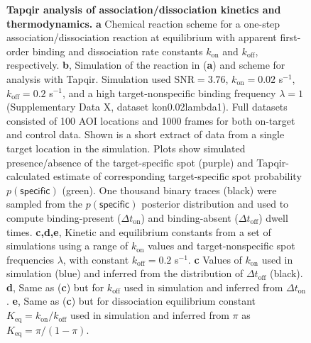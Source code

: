 \begin{figure}[h]
\caption{\textbf{Tapqir analysis of association/dissociation kinetics and thermodynamics.} \textbf{a} Chemical reaction scheme for a one-step association/dissociation reaction at equilibrium with apparent first-order binding and dissociation rate constants $k_{\mathrm{on}}$ and $k_{\mathrm{off}}$, respectively. \textbf{b}, Simulation of the reaction in (\textbf{a}) and scheme for analysis with Tapqir. Simulation used $\mathrm{SNR} = 3.76$, $k_\mathrm{on} = 0.02$ s$^{-1}$, $k_\mathrm{off} = 0.2$ s$^{-1}$, and a high target-nonspecific binding frequency $\lambda = 1$ (Supplementary Data X, dataset kon0.02lambda1). Full datasets consisted of 100 AOI locations and 1000 frames for both on-target and control data. Shown is a short extract of data from a single target location in the simulation.  Plots show simulated presence/absence of the target-specific spot  (purple) and Tapqir-calculated estimate of corresponding target-specific spot probability $p(\mathsf{specific})$ (green). One thousand binary traces (black) were sampled from the $p(\mathsf{specific})$ posterior distribution and used to compute binding-present ($\Delta t_\mathrm{on}$) and binding-absent ($\Delta t_\mathrm{off}$) dwell times. \textbf{c,d,e}, Kinetic and equilibrium constants from a set of simulations using a range of $k_\mathrm{on}$ values and  target-nonspecific spot frequencies $\lambda$, with constant $k_\mathrm{off} = 0.2$ s$^{-1}$. \textbf{c} Values of $k_{\mathrm{on}}$ used in simulation (blue) and inferred from the distribution of $\Delta t_\mathrm{off}$ (black). \textbf{d}, Same as (\textbf{c}) but for $k_{\mathrm{off}}$ used in simulation and inferred from $\Delta t_\mathrm{on}$. \textbf{e},  Same as (\textbf{c}) but for dissociation equilibrium constant $K_{\mathrm{eq}} = k_{\mathrm{on}} / k_{\mathrm{off}}$ used in simulation and inferred from $\pi$ as $K_{\mathrm{eq}} = \pi / (1 - \pi)$. }
\label{fig:kinetic_analysis}
\end{figure}

